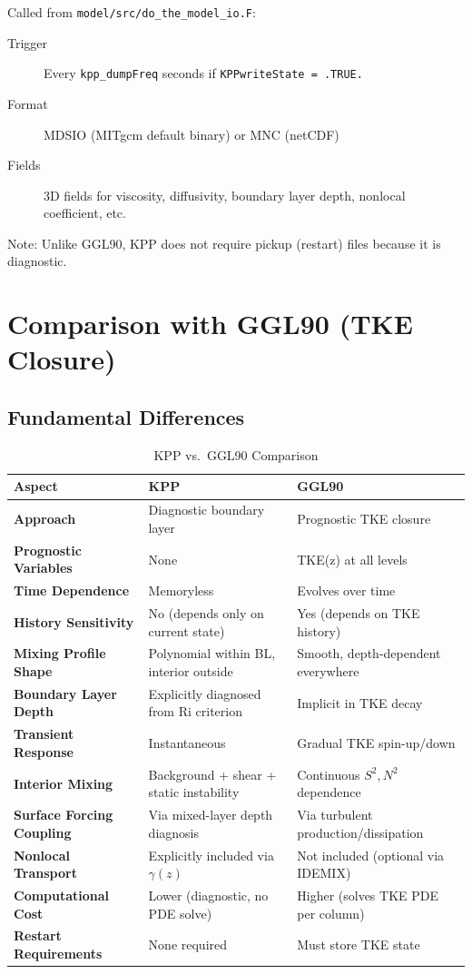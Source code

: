 \documentclass[11pt, a4paper]{article}
\begin{document}
Called from \texttt{model/src/do\_the\_model\_io.F}:

\begin{description}
    \item[Trigger] Every \texttt{kpp\_dumpFreq} seconds if \texttt{KPPwriteState = .TRUE.}
    \item[Format] MDSIO (MITgcm default binary) or MNC (netCDF)
    \item[Fields] 3D fields for viscosity, diffusivity, boundary layer depth, nonlocal coefficient, etc.
\end{description}

Note: Unlike GGL90, KPP does not require pickup (restart) files because it is diagnostic.

\section{Comparison with GGL90 (TKE Closure)}

\subsection{Fundamental Differences}

\begin{table}[h]
\centering
\caption{KPP vs.\ GGL90 Comparison}
\begin{tabular}{lll}
\toprule
\textbf{Aspect} & \textbf{KPP} & \textbf{GGL90} \\
\midrule
\textbf{Approach} & Diagnostic boundary layer & Prognostic TKE closure \\
\textbf{Prognostic Variables} & None & TKE(z) at all levels \\
\textbf{Time Dependence} & Memoryless & Evolves over time \\
\textbf{History Sensitivity} & No (depends only on current state) & Yes (depends on TKE history) \\
\textbf{Mixing Profile Shape} & Polynomial within BL, interior outside & Smooth, depth-dependent everywhere \\
\textbf{Boundary Layer Depth} & Explicitly diagnosed from Ri criterion & Implicit in TKE decay \\
\textbf{Transient Response} & Instantaneous & Gradual TKE spin-up/down \\
\textbf{Interior Mixing} & Background + shear + static instability & Continuous $S^2, N^2$ dependence \\
\textbf{Surface Forcing Coupling} & Via mixed-layer depth diagnosis & Via turbulent production/dissipation \\
\textbf{Nonlocal Transport} & Explicitly included via $\gamma(z)$ & Not included (optional via IDEMIX) \\
\textbf{Computational Cost} & Lower (diagnostic, no PDE solve) & Higher (solves TKE PDE per column) \\
\textbf{Restart Requirements} & None required & Must store TKE state \\
\end{tabular}
\end{table}
\end{document}
